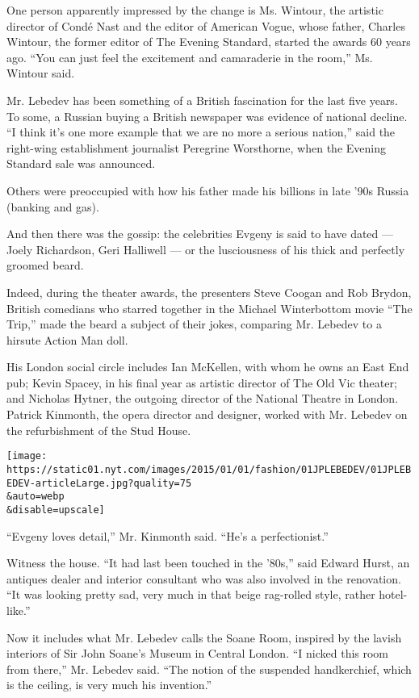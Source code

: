 One person apparently impressed by the change is Ms. Wintour, the
artistic director of Condé Nast and the editor of American Vogue, whose
father, Charles Wintour, the former editor of The Evening Standard,
started the awards 60 years ago. ``You can just feel the excitement and
camaraderie in the room,'' Ms. Wintour said.

Mr. Lebedev has been something of a British fascination for the last
five years. To some, a Russian buying a British newspaper was evidence
of national decline. ``I think it's one more example that we are no more
a serious nation,'' said the right-wing establishment journalist
Peregrine Worsthorne, when the Evening Standard sale was announced.

Others were preoccupied with how his father made his billions in late
'90s Russia (banking and gas).

And then there was the gossip: the celebrities Evgeny is said to have
dated --- Joely Richardson, Geri Halliwell --- or the lusciousness of
his thick and perfectly groomed beard.

Indeed, during the theater awards, the presenters Steve Coogan and Rob
Brydon, British comedians who starred together in the Michael
Winterbottom movie ``The Trip,'' made the beard a subject of their
jokes, comparing Mr. Lebedev to a hirsute Action Man doll.

His London social circle includes Ian McKellen, with whom he owns an
East End pub; Kevin Spacey, in his final year as artistic director of
The Old Vic theater; and Nicholas Hytner, the outgoing director of the
National Theatre in London. Patrick Kinmonth, the opera director and
designer, worked with Mr. Lebedev on the refurbishment of the Stud
House.

\texttt{[image: https://static01.nyt.com/images/2015/01/01/fashion/01JPLEBEDEV/01JPLEBEDEV-articleLarge.jpg?quality=75\\\&auto=webp\\\&disable=upscale]}

``Evgeny loves detail,'' Mr. Kinmonth said. ``He's a perfectionist.''

Witness the house. ``It had last been touched in the '80s,'' said Edward
Hurst, an antiques dealer and interior consultant who was also involved
in the renovation. ``It was looking pretty sad, very much in that beige
rag-rolled style, rather hotel-like.''

Now it includes what Mr. Lebedev calls the Soane Room, inspired by the
lavish interiors of Sir John Soane's Museum in Central London. ``I
nicked this room from there,'' Mr. Lebedev said. ``The notion of the
suspended handkerchief, which is the ceiling, is very much his
invention.''

